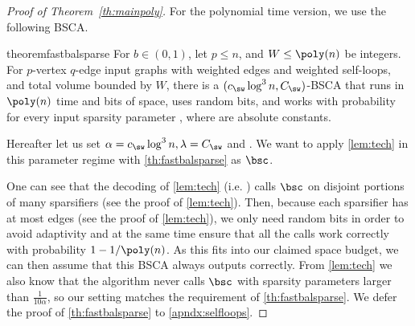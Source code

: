 \begin{proof}[Proof of Theorem~\ref{th:mainpoly}]
	For the polynomial time version, we use the following BSCA.
	\begin{restatable}{theorem}{fastbalsparse}
		\label{th:fastbalsparse}
		For $b \in (0,1)$, let $p \le n$,  and $W \le \poly(n)$ be integers.
		For $p$-vertex $q$-edge input graphs with weighted edges and weighted self-loops, and total volume bounded by $W$, there is a $(c_{\sw} \log^3 n,C_{\sw})$-BSCA that runs in $\poly(n)$ time and  bits of space, uses  random bits, and works with probability  for every input sparsity parameter ,  where  are absolute constants.
	\end{restatable}
	\noindent
	Hereafter let us set $\alpha=c_{\sw} \log^3 n,\lambda=C_{\sw}$ and . We want to apply \cref{lem:tech} in this parameter regime with \cref{th:fastbalsparse} as $\bsc$.
	
	One can see that the decoding of \cref{lem:tech} (i.e. ) calls $\bsc$ on disjoint portions of  many sparsifiers (see the proof of \cref{lem:tech}). Then, because each sparsifier has at most  edges (see the proof of \cref{lem:tech}), we only need   random bits in order to avoid adaptivity and at the same time ensure that all the calls work correctly with probability $1-1/\poly(n)$. As this fits into our claimed space budget, we can then assume that this BSCA always outputs correctly. From \cref{lem:tech} we also know that the algorithm never calls $\bsc$ with sparsity parameters larger than $\frac{1}{10\alpha}$, so our setting matches the requirement of \cref{th:fastbalsparse}. We defer the proof of \cref{th:fastbalsparse}  to \cref{apndx:selfloops}.
	 

\end{proof}

